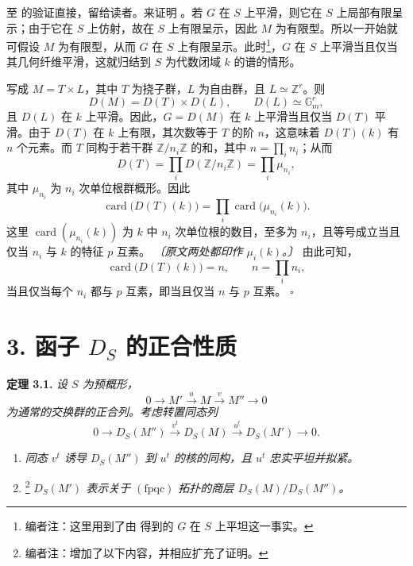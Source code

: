  至  的验证直接，留给读者。来证明 。若 \(G\) 在 \(S\) 上平滑，则它在 \(S\) 上局部有限呈示；由于它在 \(S\) 上仿射，故在 \(S\) 上有限呈示，因此 \(M\) 为有限型。所以一开始就可假设 \(M\) 为有限型，从而 \(G\) 在 \(S\) 上有限呈示。此时\footnote{编者注：这里用到了由  得到的 \(G\) 在 \(S\) 上平坦这一事实。}，\(G\) 在 \(S\) 上平滑当且仅当其几何纤维平滑，这就归结到 \(S\) 为代数闭域 \(k\) 的谱的情形。

写成 \(M=T\times L\)，其中 \(T\) 为挠子群，\(L\) 为自由群，且 \(L\simeq\mathbb Z^r\)。则
\[
  D(M)=D(T)\times D(L),
  \qquad
  D(L)\simeq\mathbb G_m^r,
\]
且 \(D(L)\) 在 \(k\) 上平滑。因此，\(G=D(M)\) 在 \(k\) 上平滑当且仅当 \(D(T)\) 平滑。由于 \(D(T)\) 在 \(k\) 上有限，其次数等于 \(T\) 的阶 \(n\)，这意味着 \(D(T)(k)\) 有 \(n\) 个元素。而 \(T\) 同构于若干群 \(\mathbb Z/n_i\mathbb Z\) 的和，其中 \(n=\prod_i n_i\)；从而
\[
  D(T)=\prod_iD(\mathbb Z/n_i\mathbb Z)
      =\prod_i\mu_{n_i},
\]
其中 \(\mu_{n_i}\) 为 \(n_i\) 次单位根群概形。因此
\[
  \operatorname{card}\bigl(D(T)(k)\bigr)
  =\prod_i\operatorname{card}\bigl(\mu_{n_i}(k)\bigr).
\]
这里 \(\operatorname{card}(\mu_{n_i}(k))\) 为 \(k\) 中 \(n_i\) 次单位根的数目，至多为 \(n_i\)，且等号成立当且仅当 \(n_i\) 与 \(k\) 的特征 \(p\) 互素。
\emph{〔原文两处都印作 \(\mu_i(k)\)。〕}
由此可知，
\[
  \operatorname{card}\bigl(D(T)(k)\bigr)=n,
  \qquad n=\prod_i n_i,
\]
当且仅当每个 \(n_i\) 都与 \(p\) 互素，即当且仅当 \(n\) 与 \(p\) 互素。
\hfill\(\square\)

\section*{3. 函子 \texorpdfstring{\(D_S\)}{D\_S} 的正合性质}

\medskip
\noindent{}\textbf{定理 3.1.}
\textit{设 \(S\) 为预概形，}
\[
  0\longrightarrow M'
   \xrightarrow{u}M
   \xrightarrow{v}M''
   \longrightarrow0
\]
\textit{为通常的交换群的正合列。考虑转置同态列}
\[
  0\longrightarrow D_S(M'')
   \xrightarrow{v^t}D_S(M)
   \xrightarrow{u^t}D_S(M')
   \longrightarrow0.
\]
\begin{enumerate}
  \item[(i)]
  \textit{同态 \(v^t\) 诱导 \(D_S(M'')\) 到 \(u^t\) 的核的同构，且 \(u^t\) 忠实平坦并拟紧。}

  \item[(ii)]%
  \footnote{编者注：增加了以下内容，并相应扩充了证明。}
  \textit{\(D_S(M')\) 表示关于 \((\mathrm{fpqc})\) 拓扑的商层 \(D_S(M)/D_S(M'')\)。}
\end{enumerate}

